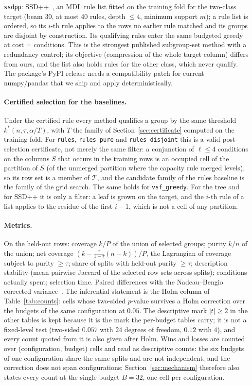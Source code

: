 \documentclass[11pt]{article}
\begin{document}
\texttt{ssdpp}: SSD++~\citep{proenca2022}, an MDL rule list fitted on the training fold for the two-class target (beam 30, at most 40 rules, depth $\le4$, minimum support $m$); a rule list is ordered, so its $i$-th rule applies to the rows no earlier rule matched and its groups are disjoint by construction. Its qualifying rules enter the same budgeted greedy at cost = conditions. This is the strongest published subgroup-set method with a redundancy control; its objective (compression of the whole target column) differs from ours, and the list also holds rules for the other class, which never qualify. The package's PyPI release needs a compatibility patch for current numpy/pandas that we ship and apply deterministically.

\paragraph{Certified selection for the baselines.} Under the certified rule every method qualifies a group by the same threshold $k^*(n,\tau,\alpha/T)$, with $T$ the family of Section~\ref{sec:certificate} computed on the training fold. For \texttt{rules}, \texttt{rules\_pure} and \texttt{rules\_disjoint} this is a valid post-selection certificate, not merely the same filter: a conjunction of $\ell\le4$ conditions on the columns $S$ that occurs in the training rows is an occupied cell of the partition of $S$ (of the unmerged partition where the capacity rule merged levels), so its row set is a member of $\mathcal{T}$, and the candidate family of the rules baseline is the family of the grid search. The same holds for \texttt{vsf\_greedy}. For the tree and for SSD++ it is only a filter: a leaf is grown on the target, and the $i$-th rule of a list applies to the residue of the first $i-1$, which is not a cell of any partition.

\paragraph{Metrics.} On the held-out rows: coverage $k/P$ of the union of selected groups; purity $k/n$ of the union; net coverage $(k-\frac{\tau}{1-\tau}(n-k))/P$, the Lagrangian of coverage subject to purity $\ge\tau$; share of splits with held-out purity $\ge\tau$; description stability (mean pairwise Jaccard of the selected row sets across splits); conditions actually spent; selection time. Paired differences with the Nadeau--Bengio corrected variance~\citep{nadeau2003}. The inferential statement is the Holm column of Table~\ref{tab:counts}: cells whose two-sided $p$-value survives a Holm correction over the budgets of the same configuration at $0.05$. The descriptive mark $|t|\ge2$ in the other tables is kept because it is the mark the per-budget tables carry; it is not a fixed-level test (two-sided $0.057$ with $24$ degrees of freedom, $0.12$ with $4$), and every count quoted from it is also given after Holm. Wins and losses are counted over (configuration, budget) cells and read as descriptive counts: the six budgets of one configuration share the same splits and are not independent, and the correction does not span configurations; Section~\ref{sec:mechanism} therefore also states every count at the single budget $B=32$, one cell per configuration.
\end{document}
